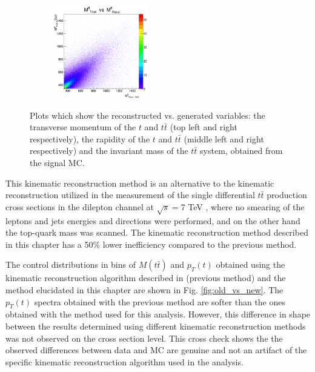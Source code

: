 \begin{figure}[t]
\begin{subfigure}
\end{subfigure}
\begin{subfigure}
  \centering
  \includegraphics[width=0.45\textwidth]{05_kinReco/plots/scatter/mtt-scaterPlot.png}
\end{subfigure}
\caption{Plots which show the reconstructed vs. generated variables: the transverse momentum of the $t$ and $t\bar{t}$ (top left and right respectively), 
        the rapidity of the $t$ and $t\bar{t}$ (middle left and right respectively) and the invariant mass of the $t\bar{t}$ system, obtained from the 
        signal MC.}
\label{fig:ScatterPl}
\end{figure}

This kinematic reconstruction method is an alternative to the kinematic reconstruction utilized in the measurement of the single differential $t\bar{t}$
production cross sections in the dilepton channel at $\sqrt{s} = $7 TeV \cite{Chatrchyan:2012saa}, where no smearing of the leptons and 
jets energies and directions were performed, and on the other hand the top-quark mass was scanned. The kinematic reconstruction method described
in this chapter has a 50\% lower inefficiency compared to the previous method.

The control distributions in bins of $M(t\bar{t})$ and $p_{T}(t)$ obtained using the kinematic reconstruction algorithm described in \cite{Chatrchyan:2012saa} (previous method)
and the method elucidated in this chapter are shown in Fig. \ref{fig:old_vs_new}. The $p_{T}(t)$ spectra obtained with the previous method are softer than the ones obtained with
the method used for this analysis. However, this difference in shape between the results determined using different kinematic reconstruction methods was not observed on 
the cross section level. This cross check shows the the observed differences between data and MC are genuine and not an artifact of the specific kinematic reconstruction 
algorithm used in the analysis.

